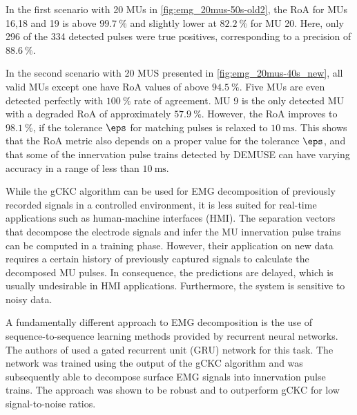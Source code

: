 In the first scenario with 20 MUs in \cref{fig:emg_20mus-50s-old2}, the RoA for MUs 16,18 and 19 is above $\SI{99.7}{\percent}$ and slightly lower at $\SI{82.2}{\percent}$ for MU 20. Here, only 296 of the 334 detected pulses were true positives, corresponding to a precision of $\SI{88.6}{\percent}$.
 
In the second scenario with 20 MUS presented in \cref{fig:emg_20mus-40s_new}, all valid MUs except one have RoA values of above $\SI{94.5}{\percent}$. Five MUs are even detected perfectly with $\SI{100}{\percent}$ rate of agreement. MU 9 is the only detected MU with a degraded RoA of approximately $\SI{57.9}{\percent}$. However, the RoA improves to $\SI{98.1}{\percent}$, if the tolerance $\eps$ for matching pulses is relaxed to $\SI{10}{\ms}$. This shows that the RoA metric also depends on a proper value for the tolerance $\eps$, and that some of the innervation pulse trains detected by DEMUSE can have varying accuracy in a range of less than $\SI{10}{\ms}$.
 
 
While the gCKC algorithm can be used for EMG decomposition of previously recorded signals in a controlled environment, it is less suited for real-time applications such as human-machine interfaces (HMI). The separation vectors that decompose the electrode signals and infer the MU innervation pulse trains can be computed in a training phase. 
However, their application on new data requires a certain history of previously captured signals to calculate the decomposed MU pulses. In consequence, the predictions are delayed, which is usually undesirable in HMI applications. Furthermore, the system is sensitive to noisy data. 

A fundamentally different approach to EMG decomposition is the use of sequence-to-sequence learning methods provided by recurrent neural networks. The authors of \cite{Clarke2021} used a gated recurrent unit (GRU) network for this task. The network was trained using the output of the gCKC algorithm and was subsequently able to decompose surface EMG signals into innervation pulse trains. The approach was shown to be robust and to outperform gCKC for low signal-to-noise ratios.

